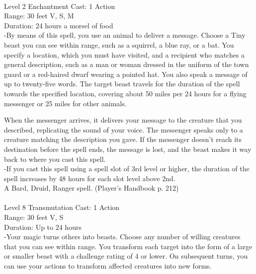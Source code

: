 \documentclass[10pt,twocolumn]{report}
\begin{document}
 \\
Level 2 \quad Enchantment \quad Cast: 1 Action\\
Range: 30 feet \quad V, S, M\\
Duration: 24 hours \quad a morsel of food\\
-By means of this spell, you use an animal to deliver a message.
Choose a Tiny beast you can see within range, such as a squirrel, a blue ray, or a bat. You specify a location, which you must have visited, and a recipient who matches a general description, such as a man or woman dressed in the uniform of the town guard or a red-haired dwarf wearing a pointed hat. You also speak a message of up to twenty-five words. The target beast travels for the duration of the spell towards the specified location, covering about 50 miles per 24 hours for a flying messenger or 25 miles for other animals.

When the messenger arrives, it delivers your message to the creature that you described, replicating the sound of your voice. The messenger speaks only to a creature matching the description you gave. If the messenger doesn’t reach its destination before the spell ends, the message is lost, and the beast makes it way back to where you cast this spell.\\
-If you cast this spell using a spell slot of 3rd level or higher, the duration of the spell increases by 48 hours for each slot level above 2nd.\\
A Bard, Druid, Ranger spell. (Player's Handbook p. 212) \\


 \\
Level 8 \quad Transmutation \quad Cast: 1 Action\\
Range: 30 feet \quad V, S\\
Duration: Up to 24 hours \quad \\
-Your magic turns others into beasts. 
Choose any number of willing creatures that you can see within range. You transform each target into the form of a large or smaller beast with a challenge rating of 4 or lower. On subsequent turns, you can use your actions to transform affected creatures into new forms. 
\end{document}
